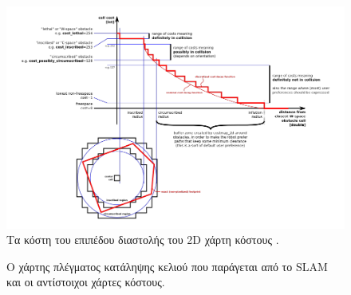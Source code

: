 \begin{figure}[!ht]
	\centering
	\includegraphics[width=\linewidth]{Chapters/Chapter4/Figures/costmap_inflation_costs.png}
	\caption{Τα κόστη του επιπέδου διαστολής του 2D χάρτη κόστους \cite{costmap_2d}.}
	\label{fig:costmap_inflation_costs}
\end{figure}


\begin{figure}[!ht]
	\centering
	\caption{Ο χάρτης πλέγματος κατάληψης κελιού που παράγεται από το SLAM και οι αντίστοιχοι χάρτες κόστους.}
	\label{fig:costmaps}
\end{figure}


